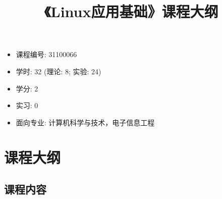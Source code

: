 \documentclass{wx672article}
\title{《Linux应用基础》课程大纲}
\author{}
\date{}
\begin{document}
\maketitle

\begin{itemize}
\item 课程编号: 31100066
\item 学时: 32 (理论: 8; 实验: 24)
\item 学分: 2
\item 实习: 0
\item 面向专业: 计算机科学与技术，电子信息工程
\end{itemize}

\section{课程大纲}

\subsection{课程内容}
\end{document}
